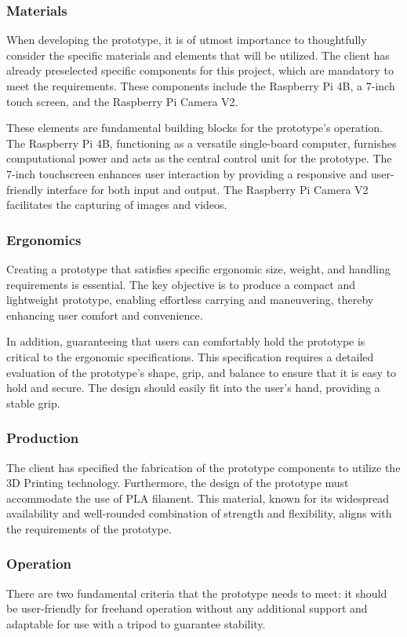 \subsubsection{Materials}
When developing the prototype, it is of utmost importance to thoughtfully consider the specific materials and elements that will be utilized. The client has already preselected specific components for this project, which are mandatory to meet the requirements. These components include the Raspberry Pi 4B, a 7-inch touch screen, and the Raspberry Pi Camera V2.

These elements are fundamental building blocks for the prototype's operation. The Raspberry Pi 4B, functioning as a versatile single-board computer, furnishes computational power and acts as the central control unit for the prototype. The 7-inch touchscreen enhances user interaction by providing a responsive and user-friendly interface for both input and output. The Raspberry Pi Camera V2 facilitates the capturing of images and videos.

\subsubsection{Ergonomics}
Creating a prototype that satisfies specific ergonomic size, weight, and handling requirements is essential. The key objective is to produce a compact and lightweight prototype, enabling effortless carrying and maneuvering, thereby enhancing user comfort and convenience.

In addition, guaranteeing that users can comfortably hold the prototype is critical to the ergonomic specifications. This specification requires a detailed evaluation of the prototype's shape, grip, and balance to ensure that it is easy to hold and secure. The design should easily fit into the user's hand, providing a stable grip.

\subsubsection{Production}
The client has specified the fabrication of the prototype components to utilize the 3D Printing technology. Furthermore, the design of the prototype must accommodate the use of PLA filament. This material, known for its widespread availability and well-rounded combination of strength and flexibility, aligns with the requirements of the prototype.

\subsubsection{Operation}
There are two fundamental criteria that the prototype needs to meet: it should be user-friendly for freehand operation without any additional support and adaptable for use with a tripod to guarantee stability.

